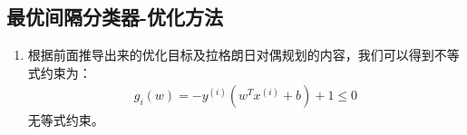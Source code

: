 \subsection{最优间隔分类器-优化方法}
\begin{enumerate}
	\item 根据前面推导出来的优化目标及拉格朗日对偶规划的内容，我们可以得到不等式约束为：
	\begin{align}
		g_i(w) = -y^{(i)}\left(w^Tx^{(i)}+b\right)+1 \leq 0
	\end{align}
	无等式约束。\\
	

\end{enumerate}

















